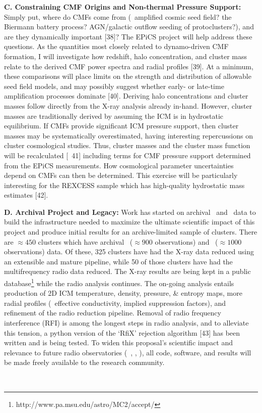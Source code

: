 \documentclass[letterpaper,12pt]{article}
\newcommand{\myhead}{Cavagnolo, Jansky Proposal}
\begin{document}
{\bf{C. Constraining CMF Origins and Non-thermal Pressure Support:}}
Simply put, where do CMFs come from (\eg\ amplified cosmic seed field?
the Biermann battery process?  AGN/galactic outflow seeding of
protoclusters?), and are they dynamically important [38]? The EPiCS
project will help address these questions. As the quantities most
closely related to dynamo-driven CMF formation, I will investigate how
redshift, halo concentration, and cluster mass relate to the derived
CMF power spectra and radial profiles [39]. At a minimum, these
comparisons will place limits on the strength and distribution of
allowable seed field models, and may possibly suggest whether early-
or late-time amplification processes dominate [40]. Deriving halo
concentrations and cluster masses follow directly from the X-ray
analysis already in-hand. However, cluster masses are traditionally
derived by assuming the ICM is in hydrostatic equilibrium. If CMFs
provide significant ICM pressure support, then cluster masses may be
systematically overestimated, having interesting repercussions on
cluster cosmological studies. Thus, cluster masses and the cluster
mass function will be recalculated [\eg\ 41] including terms for CMF
pressure support determined from the EPiCS measurements. How
cosmological parameter uncertainties depend on CMFs can then be
determined. This exercise will be particularly interesting for the
REXCESS sample which has high-quality hydrostatic mass estimates [42].

{\bf{D. Archival Project and Legacy:}} Work has started on archival
\chandra\ and \vla\ data to build the infrastructure needed to
maximize the ultimate scientific impact of this project and produce
initial results for an archive-limited sample of clusters. There are
$\approx 450$ clusters which have archival \chandra\ ($\approx 900$
observations) and \vla\ ($\approx 1000$ observations) data. Of these,
325 clusters have had the X-ray data reduced using an extensible and
mature pipeline, while 50 of those clusters have had the
multifrequency radio data reduced. The X-ray results are being kept in
a public database\footnote{http://www.pa.msu.edu/astro/MC2/accept/}
while the radio analysis continues. The on-going analysis entails
production of 2D ICM temperature, density, pressure, \& entropy maps,
more radial profiles (\eg\ effective conductivity, implied suppression
factors), and refinement of the radio reduction pipeline. Removal of
radio frequency interference (RFI) is among the longest steps in radio
analysis, and to alleviate this tension, a python version of the
`RfiX' rejection algorithm [43] has been written and is being
tested. To widen this proposal's scientific impact and relevance to
future radio observatories (\eg\ \lofar, \lwa, \ska), all code,
software, and results will be made freely available to the research
community.\\

\markright{\myhead}\\



\markright{\myhead}




\end{document}
